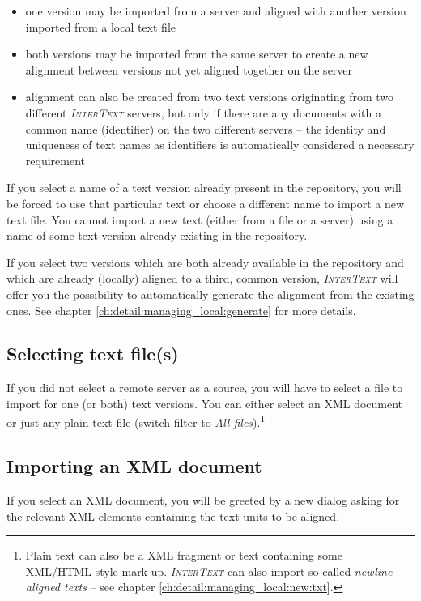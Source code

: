 \documentclass[a4paper,10pt,oneside]{book}
\newcommand{\IT}{\textit{\textsc{InterText}}\xspace}
\begin{document}
\begin{itemize}
 \item one version may be imported from a server and aligned with another version imported from a local text file
 \item both versions may be imported from the same server to create a new alignment between versions not yet aligned together on the server
 \item alignment can also be created from two text versions originating from two different \IT servers, but only if there are any documents with a common name (identifier) on the two different servers -- the identity and uniqueness of text names as identifiers is automatically considered a necessary requirement
\end{itemize}

If you select a name of a text version already present in the repository, you will be forced to use that particular text or choose a different name to import a new text file. You cannot import a new text (either from a file or a server) using a name of some text version already existing in the repository.

If you select two versions which are both already available in the repository and which are already (locally) aligned to a third, common version, \IT will offer you the possibility to automatically generate the alignment from the existing ones. See chapter \ref{ch:detail:managing_local:generate} for more details.

\subsection{Selecting text file(s)}\label{ch:detail:managing_local:new:files}

If you did not select a remote server as a source, you will have to select a file to import for one (or both) text versions. You can either select an XML document or just any plain text file (switch filter to \emph{All files}).\footnote{Plain text can also be a XML fragment or text containing some XML/HTML-style mark-up. \IT can also import so-called \emph{newline-aligned texts} -- see chapter \ref{ch:detail:managing_local:new:txt}.}

\subsection{Importing an XML document}\label{ch:detail:managing_local:new:xml}

If you select an XML document, you will be greeted by a new dialog asking for the relevant XML elements containing the text units to be aligned.
\end{document}
